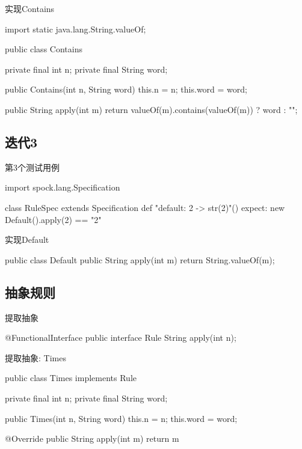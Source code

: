 \begin{frame}[fragile]{实现Contains}
  \begin{java}
import static java.lang.String.valueOf;

public class Contains {
  private final int n;
  private final String word;

  public Contains(int n, String word) {
    this.n = n;
    this.word = word;
  }

  public String apply(int m) {
    return valueOf(m).contains(valueOf(m)) ? word : "";
  }
}  
  \end{java}
\end{frame}

\subsection{迭代3}

\begin{frame}[fragile]{第3个测试用例}
  \begin{scala}
import spock.lang.Specification

class RuleSpec extends Specification {
  def "default: 2 -> str(2)"() {
    expect:
    new Default().apply(2) == "2"
  }
}  
  \end{scala}
\end{frame}

\begin{frame}[fragile]{实现Default}
  \begin{java}
public class Default {
  public String apply(int m) {
    return String.valueOf(m);
  }
}  
  \end{java}
\end{frame}

\subsection{抽象规则}

\begin{frame}[fragile]{提取抽象}
  \begin{java}
@FunctionalInterface
public interface Rule {
  String apply(int n);
}  
  \end{java}
\end{frame}

\begin{frame}[fragile]{提取抽象: Times}
  \begin{java}
public class Times implements Rule {
  private final int n;
  private final String word;

  public Times(int n, String word) {
    this.n = n;
    this.word = word;
  }

  @Override
  public String apply(int m) {
    return m %
  }
}
  \end{java}
\end{frame}

